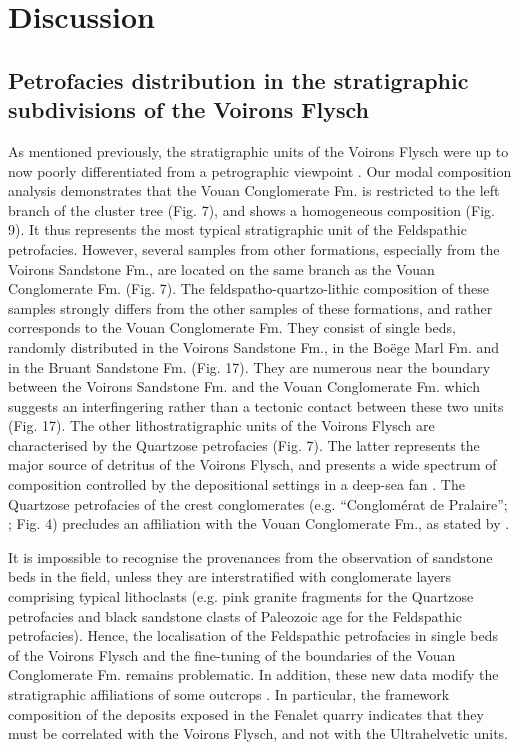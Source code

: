 \documentclass[twoside]{article}
\begin{document}
\section{Discussion}

\subsection{Petrofacies distribution in the stratigraphic subdivisions of the Voirons Flysch}

As mentioned previously, the stratigraphic units of the Voirons Flysch were up to now poorly differentiated from a petrographic viewpoint \citep{Lombard1940a,Stuijvenberg1980a,Charollais1998}. Our modal composition analysis demonstrates that the Vouan Conglomerate Fm. is restricted to the left branch of the cluster tree (Fig. 7), and shows a homogeneous composition (Fig. 9). It thus represents the most typical stratigraphic unit of the Feldspathic petrofacies. However, several samples from other formations, especially from the Voirons Sandstone Fm., are located on the same branch as the Vouan Conglomerate Fm. (Fig. 7). The feldspatho-quartzo-lithic composition of these samples strongly differs from the other samples of these formations, and rather corresponds to the Vouan Conglomerate Fm. They consist of single beds, randomly distributed in the Voirons Sandstone Fm., in the Boëge Marl Fm. and in the Bruant Sandstone Fm. (Fig. 17). They are numerous near the boundary between the Voirons Sandstone Fm. and the Vouan Conglomerate Fm. which suggests an interfingering rather than a tectonic contact between these two units (Fig. 17).
The other lithostratigraphic units of the Voirons Flysch are characterised by the Quartzose petrofacies (Fig. 7). The latter represents the major source of detritus of the Voirons Flysch, and presents a wide spectrum of composition controlled by the depositional settings in a deep-sea fan \citep{Ragusa2015}. The Quartzose petrofacies of the crest conglomerates (e.g. “Conglomérat de Pralaire”; \citealp{Lombard1940a}; Fig. 4) precludes an affiliation with the Vouan Conglomerate Fm., as stated by \citep{Stuijvenberg1980a}.\par
It is impossible to recognise the provenances from the observation of sandstone beds in the field, unless they are interstratified with conglomerate layers comprising typical lithoclasts (e.g. pink granite fragments for the Quartzose petrofacies and black sandstone clasts of Paleozoic age for the Feldspathic petrofacies). Hence, the localisation of the Feldspathic petrofacies in single beds of the Voirons Flysch and the fine-tuning of the boundaries of the Vouan Conglomerate Fm. remains problematic. In addition, these new data modify the stratigraphic affiliations of some outcrops \citep{Ragusa2015}. In particular, the framework composition of the deposits exposed in the Fenalet quarry indicates that they must be correlated with the Voirons Flysch, and not with the Ultrahelvetic units.
\end{document}
